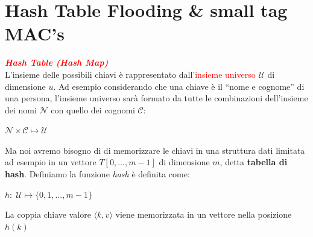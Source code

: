 \newpage

\section{Hash Table Flooding \& small tag MAC's}

\begin{flushleft}
    \textcolor{red}{\textbf{\textit{Hash Table (Hash Map)}}} \\
    L'insieme delle possibili chiavi è rappresentato dall'\textcolor{red}{insieme universo} $\mathcal{U}$ di dimensione $u$. Ad esempio considerando che una chiave è il ``nome e cognome'' di una persona, l'insieme universo sarà formato da tutte le combinazioni dell'insieme dei nomi $\mathcal{N}$ con quello dei cognomi $\mathcal{C}$: 
    
    {\centering
        $\mathcal{N} \times \mathcal{C} \mapsto \mathcal{U}$
    \par}

    Ma noi avremo bisogno di di memorizzare le chiavi in una struttura dati limitata ad esempio in un vettore $T[0, ..., m - 1]$ di dimensione $m$, detta \textbf{tabella di hash}. Definiamo la funzione \textit{hash} è definita come:

    {\centering
        $h: \; \mathcal{U} \mapsto \{0, 1, ..., m - 1\}$
    \par}

    La coppia chiave valore $\langle k, v \rangle$ viene memorizzata in un vettore nella posizione $h(k)$


\end{flushleft}
